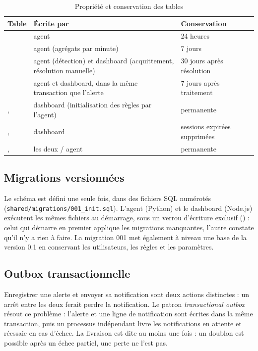 \begin{table}[htbp]
\centering
\small
\begin{tabularx}{\linewidth}{L{3.6cm}L{4.2cm}Y}
\toprule
\textbf{Table} & \textbf{Écrite par} & \textbf{Conservation} \\
\midrule
{} & agent & 24 heures \\
 & agent (agrégats par minute) & 7 jours \\
 & agent (détection) et dashboard (acquittement, résolution manuelle) & 30 jours après résolution \\
 & agent et dashboard, dans la même transaction que l'alerte & 7 jours après traitement \\
,  & dashboard (initialisation des règles par l'agent) & permanente \\
,  & dashboard & sessions expirées supprimées \\
,  & les deux / agent & permanente \\
\bottomrule
\end{tabularx}
\caption{Propriété et conservation des tables}
\label{tab:tables}
\end{table}

\subsection{Migrations versionnées}

Le schéma est défini une seule fois, dans des fichiers SQL numérotés
(\nolinkurl{shared/migrations/001_init.sql}). L'agent (Python) et le dashboard (Node.js) exécutent
les mêmes fichiers au démarrage, sous un verrou d'écriture exclusif () :
celui qui démarre en premier applique les migrations manquantes, l'autre constate qu'il n'y a
rien à faire. La migration 001 met également à niveau une base de la version 0.1 en conservant
les utilisateurs, les règles et les paramètres.

\subsection{Outbox transactionnelle}

Enregistrer une alerte et envoyer sa notification sont deux actions distinctes : un arrêt entre
les deux ferait perdre la notification. Le patron \emph{transactional outbox}
\cite{outbox} résout ce problème : l'alerte et une ligne de notification sont écrites dans la
même transaction, puis un processus indépendant livre les notifications en attente et réessaie
en cas d'échec. La livraison est dite \og au moins une fois \fg{} : un doublon est possible
après un échec partiel, une perte ne l'est pas.


